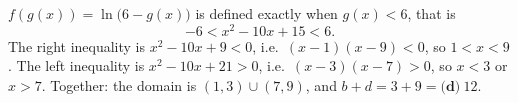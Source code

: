 $f(g(x))=\ln\bigl(6-g(x)\bigr)$ is defined exactly when $g(x)<6$, that is
\[
-6<x^2-10x+15<6 .
\]
The right inequality is $x^2-10x+9<0$, i.e.\ $(x-1)(x-9)<0$, so $1<x<9$. The left inequality is $x^2-10x+21>0$, i.e.\ $(x-3)(x-7)>0$, so $x<3$ or $x>7$. Together: the domain is $(1,3)\cup(7,9)$, and $b+d=3+9=\boxed{\textbf{(d)}\ 12}$.
